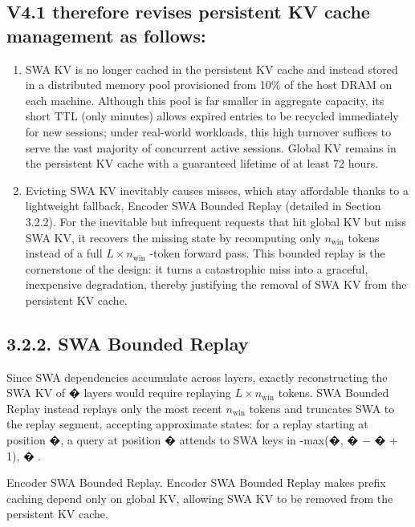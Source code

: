 \documentclass[
  10
]{article}
\begin{document}
\subsection{V4.1 therefore revises persistent KV cache management as
follows:}\label{v4.1-therefore-revises-persistent-kv-cache-management-as-follows}

\begin{enumerate}
\def\labelenumi{\arabic{enumi}.}
\item
  SWA KV is no longer cached in the persistent KV cache and instead
  stored in a distributed memory pool provisioned from 10\% of the host
  DRAM on each machine. Although this pool is far smaller in aggregate
  capacity, its short TTL (only minutes) allows expired entries to be
  recycled immediately for new sessions; under real-world workloads,
  this high turnover suffices to serve the vast majority of concurrent
  active sessions. Global KV remains in the persistent KV cache with a
  guaranteed lifetime of at least 72 hours.
\item
  Evicting SWA KV inevitably causes misses, which stay affordable thanks
  to a lightweight fallback, Encoder SWA Bounded Replay (detailed in
  Section 3.2.2). For the inevitable but infrequent requests that hit
  global KV but miss SWA KV, it recovers the missing state by
  recomputing only \(n _ { \mathrm { w i n } }\) tokens instead of a
  full \(L \times n _ { \mathrm { w i n } }\) -token forward pass. This
  bounded replay is the cornerstone of the design: it turns a
  catastrophic miss into a graceful, inexpensive degradation, thereby
  justifying the removal of SWA KV from the persistent KV cache.
\end{enumerate}

\subsection{3.2.2. SWA Bounded Replay}\label{swa-bounded-replay}

Since SWA dependencies accumulate across layers, exactly reconstructing
the SWA KV of � layers would require replaying
\(L \times n _ { \mathrm { w i n } }\) tokens. SWA Bounded Replay
instead replays only the most recent \(n _ { \mathrm { { w i n } } }\)
tokens and truncates SWA to the replay segment, accepting approximate
states: for a replay starting at position �, a query at position �
attends to SWA keys in -max(�, � − � + 1), �.

Encoder SWA Bounded Replay. Encoder SWA Bounded Replay makes prefix
caching depend only on global KV, allowing SWA KV to be removed from the
persistent KV cache.
\end{document}
